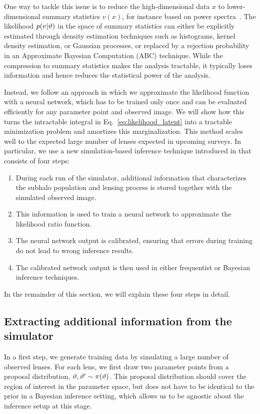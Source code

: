 \documentclass[twocolumn]{aastex62}
\begin{document}
One way to tackle this issue is to reduce the high-dimensional data $x$ to lower-dimensional summary statistics $v(x)$, for instance based on power spectra~\citep{1403.2720,1809.00004,1707.04590,1806.07897,1808.03501,1710.03075,1506.01724}. The likelihood $p(v|\vartheta)$ in the space of summary statistics can either be explicitly estimated through density estimation techniques such as histograms, kernel density estimation, or Gaussian processes, or replaced by a rejection probability in an Approximate Bayesian Computation (ABC) technique. While the compression to summary statistics makes the analysis tractable, it typically loses information and hence reduces the statistical power of the analysis.

Instead, we follow an approach in which we approximate the likelihood function with a neural network, which has to be trained only once and can be evaluated efficiently for any parameter point and observed image. We will show how this turns the intractable integral in Eq.~\eqref{eq:likelihood_latent} into a tractable minimization problem and amortizes this marginalization. This method scales well to the expected large number of lenses expected in upcoming surveys.  In particular, we use a new simulation-based inference technique introduced in \cite{1805.00013,1805.00020,1805.12244} that consists of four steps:
%
\begin{enumerate}
  \item During each run of the simulator, additional information that characterizes the subhalo population and lensing process is stored together with the simulated observed image.
  \item This information is used to train a neural network to approximate the likelihood ratio function.
  \item The neural network output is calibrated, ensuring that errors during training do not lead to wrong inference results.
  \item The calibrated network output is then used in either frequentist or Bayesian inference techniques.
\end{enumerate}
%
In the remainder of this section, we will explain these four steps in detail.


\subsection{Extracting additional information from the simulator}
\label{sec:lfi-gold}

In a first step, we generate training data by simulating a large number of observed lenses. For each lens, we first draw two parameter points from a proposal distribution, $\vartheta, \vartheta' \sim \pi(\vartheta)$. This proposal distribution should cover the region of interest in the parameter space, but does not have to be identical to the prior in a Bayesian inference setting, which allows us to be agnostic about the inference setup at this stage.
\end{document}
